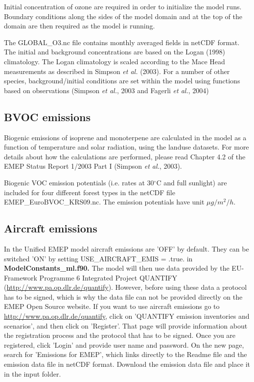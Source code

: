 Initial concentration of ozone are required in order to
initialize the model runs. Boundary conditions along the sides of the model
domain and at the top of the domain are then required as the model is
running.

The GLOBAL\_O3.nc file contains monthly averaged fields in netCDF format. 
The initial and background
concentrations are based on the Logan (1998) climatology. The Logan
climatology is scaled according to the Mace Head measurements as
described in Simpson {\sl et al.} (2003). For a number of other species, 
background/initial conditions are set within the model using functions 
based on observations (Simpson {\sl et al.}, 2003 and Fagerli {\sl et al.}, 2004)



\subsection{BVOC emissions}

Biogenic emissions of isoprene and monoterpene are calculated in the model as a function of temperature 
and solar radiation, using the landuse datasets.  For more details about how the
calculations are performed, please read Chapter 4.2 of the EMEP
Status Report 1/2003 Part I (Simpson {\sl et al.}, 2003).

Biogenic VOC emission potentials (i.e. rates at 30$^\circ$C and full sunlight)
are included for four different forest types in the netCDF file 
EMEP\_EuroBVOC\_KRS09.nc. 
The emission potentials have unit $\mu g/m^{2} /h$.






\subsection{Aircraft emissions}
In the Unified EMEP model aircraft emissions are 'OFF' by default. 
They can be switched 'ON' by setting USE\_AIRCRAFT\_EMIS = .true. in { \bf ModelConstants\_ml.f90.} 
The model will then use data provided by the EU-Framework Programme 6 Integrated 
Project QUANTIFY (\url{http://www.pa.op.dlr.de/quantify}). However, before using 
these data a protocol has to be signed, which is why the data file can not be provided 
directly on the EMEP Open Source website. If you want to use aircraft emissions go to 
\url{http://www.pa.op.dlr.de/quantify}, click on 'QUANTIFY emission inventories and scenarios', 
and then click on 'Register'. That page will provide information about the registration 
process and the protocol that has to be signed. Once you are registered, click 'Login' and 
provide user name and password. On the new page, search for 'Emissions for EMEP', which 
links directly to the Readme file and the emission data file in netCDF format. Download the 
emission data file and place it in the input folder.

